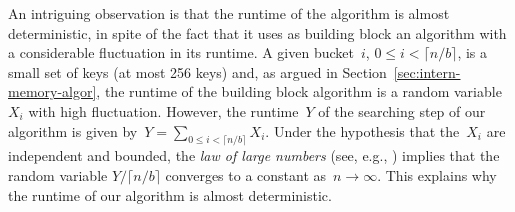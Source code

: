 An intriguing observation is that the runtime of the algorithm is almost
deterministic, in spite of the fact that it uses as building block an
algorithm with a considerable fluctuation in its runtime.  A given bucket~$i$,
$0 \leq i < \lceil n/b \rceil$, is a small set of keys (at most 256 keys) and,
as argued in Section~\ref{sec:intern-memory-algor}, the runtime of the
building block algorithm is a random variable~$X_i$ with high fluctuation.
However, the runtime~$Y$ of the searching step of our algorithm is given
by~$Y=\sum_{0\leq i<\lceil n/b\rceil}X_i$.  Under the hypothesis that
the~$X_i$ are independent and bounded, the {\it law of large numbers} (see,
e.g., \cite{j91}) implies that the random variable $Y/\lceil n/b\rceil$
converges to a constant as~$n\to\infty$.  This explains why the runtime of our
algorithm is almost deterministic.


